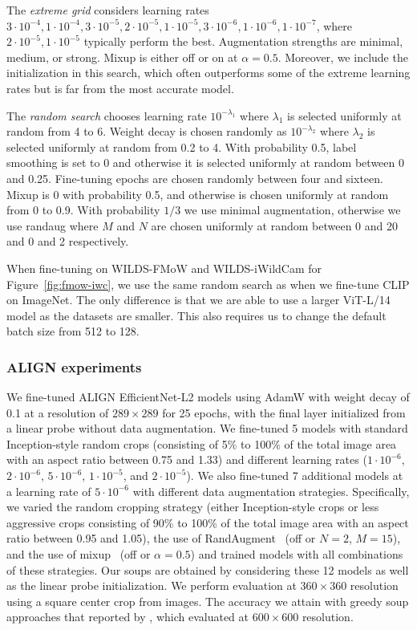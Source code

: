 \documentclass[nohyperref]{article}
\theoremstyle{plain}
\theoremstyle{definition}
\theoremstyle{remark}
\begin{document}
    
    The \emph{extreme grid} considers 
    learning rates $3 \cdot 10^{-4}, 1 \cdot 10^{-4}, 3 \cdot 10^{-5}, 2 \cdot 10^{-5}, 1 \cdot 10^{-5}, 3 \cdot 10^{-6}, 1\cdot 10^{-6}, 1\cdot 10^{-7}$, where $2 \cdot 10^{-5}, 1 \cdot 10^{-5}$ typically perform the best.
    Augmentation strengths are minimal, medium, or strong. Mixup is either off or on at $\alpha = 0.5$.
    Moreover, we include the initialization in this search, which often outperforms some of the extreme learning rates but is far from the most accurate model.
    
    
    The \emph{random search} chooses learning rate $10^{-\lambda_1}$ where
    $\lambda_1$ is selected uniformly at random  from 4 to 6.
    Weight decay is chosen randomly as $10^{-\lambda_2}$ where
    $\lambda_2$ is selected uniformly at random  from 0.2 to 4.
    With probability 0.5, label smoothing is set to 0 and otherwise it
    is selected uniformly at random between 0 and 0.25.
    Fine-tuning epochs are chosen randomly between four and sixteen.
    Mixup is 0 with probability 0.5, and otherwise is chosen
    uniformly at random from 0 to 0.9.
    With probability $1/3$ we use minimal augmentation,
    otherwise we use randaug where $M$ and $N$ are chosen
    uniformly at random between 0 and 20 and 0 and 2 respectively.
    
    When fine-tuning on WILDS-FMoW and WILDS-iWildCam for Figure~\ref{fig:fmow-iwc},
    we use the same random search as when we fine-tune CLIP on ImageNet.
    The only difference is that we are able to use a larger ViT-L/14 model
    as the datasets are smaller. This also requires us to change the default batch size
    from 512 to 128.
    
    \subsubsection{ALIGN experiments} \label{app:aligndetails}
    We fine-tuned ALIGN EfficientNet-L2 models using AdamW with weight decay of 0.1 at a resolution of $289 \times 289$ for 25 epochs, with the final layer initialized from a linear probe without data augmentation. We fine-tuned 5 models with standard Inception-style random crops (consisting of 5\% to 100\% of the total image area with an aspect ratio between 0.75 and 1.33) and different learning rates ($1 \cdot 10^{-6}$, $2 \cdot 10^{-6}$, $5 \cdot 10^{-6}$, $1 \cdot 10^{-5}$, and $2 \cdot 10^{-5}$). We also fine-tuned 7 additional models at a learning rate of $5 \cdot 10^{-6}$ with different data augmentation strategies. Specifically, we varied the random cropping strategy (either Inception-style crops or less aggressive crops consisting of 90\% to 100\% of the total image area with an aspect ratio between 0.95 and 1.05), the use of RandAugment~\cite{cubuk2020randaugment} (off or $N = 2$, $M = 15$), and the use of mixup~\cite{zhang2017mixup} (off or $\alpha = 0.5$) and trained models with all combinations of these strategies. Our soups are obtained by considering these 12 models as well as the linear probe initialization. We perform evaluation at $360 \times 360$ resolution using a square center crop from images. The accuracy we attain with greedy soup approaches that reported by \citet{jia2021scaling}, which evaluated at $600 \times 600$ resolution.
    
\end{document}
